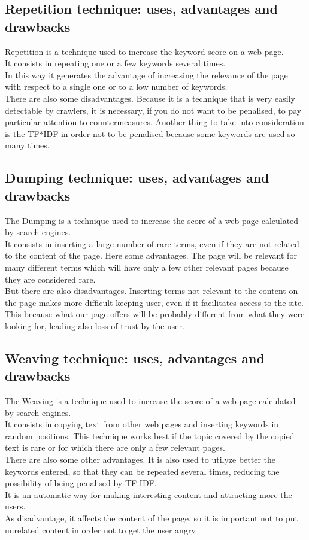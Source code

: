 \subsection{Repetition technique: uses, advantages and drawbacks}
Repetition is a technique used to increase the keyword score on a web page.\\
It consists in repeating one or a few keywords several times.\\
In this way
it generates the advantage of
increasing the relevance of the page with respect to a single one
or to a low number of keywords.\\ There are also some disadvantages.
Because it is a technique that is very easily
detectable by crawlers, it is necessary, if you do not want to be penalised,
to pay particular attention to countermeasures.
Another thing to take into consideration is the TF*IDF in order not to be
penalised because some keywords are used so many times.

\newpage

\subsection{Dumping technique: uses, advantages and drawbacks}
The Dumping is a technique used to increase the score of a
web page calculated by search engines.\\
It consists in inserting a large number of rare terms, even if they
are not related to the content of the page. Here some advantages.
The page will be relevant for many different terms which will have only
a few other relevant pages because they are considered rare.\\
But there are also disadvantages.
Inserting terms not relevant to the content on the page makes more difficult
keeping user, even if it facilitates access to the site.
This because what our page offers will be probably different from what
they were looking for, leading also loss of trust by the user.

\subsection{Weaving technique: uses, advantages and drawbacks}
The Weaving is a technique used to increase the score of a web page
calculated by search engines.\\
It consists in copying text from other web pages and inserting keywords
in random positions.
This technique works best if the topic covered by the copied text is rare
or for which there are only a few relevant pages.\\
There are also some other advantages. It is also used to utilyze better
the keywords entered,
so that they can be repeated several times, reducing the possibility
of being penalised by TF-IDF.\\ It is an automatic way for making
interesting content and attracting more the users.\\
As disadvantage, it affects the content of the page, so
it is important not to put unrelated content in order not to get the user
angry.

